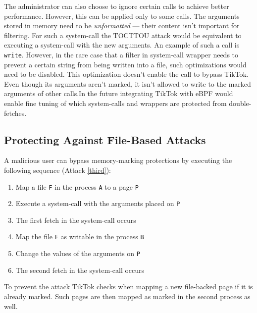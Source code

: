 The administrator can also choose to ignore certain calls to achieve better
performance. However, this can be applied only to some calls. The arguments
stored in memory need to be \emph{unformatted} --- their content isn't important
for filtering. For such a system-call the TOCTTOU attack would be equivalent to executing
a system-call with the new arguments. An example of such a call is
\texttt{write}. However, in the rare case that a filter in system-call wrapper
needs to prevent a certain string from being written into a file, such
optimizations would need to be disabled. This optimization doesn't enable the
call to bypass TikTok. Even though its arguments aren't marked, it isn't allowed
to write to the marked arguments of other calls.In the future integrating TikTok
with eBPF would enable fine tuning of which system-calls and wrappers are
protected from double-fetches.


\subsection{Protecting Against File-Based Attacks}
\label{subsec:filewrites}

A malicious user can bypass memory-marking protections by executing the following
sequence (Attack \ref{third}):

\begin{enumerate}
  \item Map a file \texttt{F} in the process \texttt{A} to a page \texttt{P}
  \item Execute a system-call with the arguments placed on \texttt{P}
  \item The first fetch in the system-call occurs
  \item Map the file \texttt{F} as writable in the process \texttt{B}
  \item Change the values of the arguments on \texttt{P}
  \item The second fetch in the system-call occurs
\end{enumerate}



To prevent the attack TikTok checks when mapping a new file-backed page if
it is already marked. Such pages are then mapped as marked in the second process
as well.

